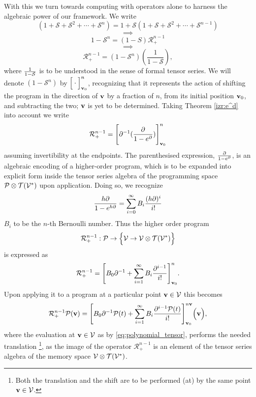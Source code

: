 With this we turn towards computing with operators alone to harness the algebraic power of our framework. We write
$$(1+\mathcal{S}+\mathcal{S}^2+\cdots+\mathcal{S}^n)=1+\mathcal{S}(1+\mathcal{S}+\mathcal{S}^2+\cdots+\mathcal{S}^{n-1})$$
   $$\implies$$
   $$1-\mathcal{S}^n=(1-S)\mathcal{R}^{n-1}_+$$
   $$\implies$$
  \begin{equation}
\mathcal{R}^{n-1}_+=(1-\mathcal{S}^n)(\frac{1}{1-\mathcal{S}}),
  \end{equation}
where $\frac{1}{1-\mathcal{S}}$ is to be understood in the sense of formal tensor series. We will denote $(1-\mathcal{S}^n)$ by $\Big[\cdot\Big]^n_{\mathbf{v}_0}$, recognizing that it represents the action of shifting the program in the direction of $\mathbf{v}$ by a fraction of $n$, from its initial position $\mathbf{v}_0$, and subtracting the two; $\mathbf{v}$ is yet to be determined. Taking Theorem \ref{izr:e^d} into account we write
  \begin{equation}\label{eq:Rn+Basic}
    \mathcal{R}^{n-1}_+=\Bigg[\partial^{-1}(\frac{\partial}{1-e^\partial})\Bigg]^n_{\mathbf{v}_0}
  \end{equation}
assuming invertibility at the endpoints. The parenthesised expression, $\frac{\partial}{1-e^\partial}$, is an algebraic encoding of a higher-order program, which is to be expanded into explicit form inside the tensor series algebra of the programming space $\mathcal{P}\otimes \mathcal{T}(\mathcal{V}^*)$ upon application. Doing so, we recognize
\begin{equation}
    	\frac{h\partial}{1-e^{h\partial}}=\sum\limits_{i=0}^{\infty}B_i\frac{(h\partial)^i}{i!}
    \end{equation}
$B_i$ to be the $n$-th Bernoulli number. Thus the higher order program
$$\mathcal{R}^{n-1}_+:\mathcal{P}\to\Big\{\mathcal{V}\to \mathcal{V}\otimes \mathcal{T}(\mathcal{V}^*)\Big\}$$
is expressed as 
    \begin{equation}\label{eq:Rn+}
      \mathcal{R}^{n-1}_+=\Bigg[B_0\partial^{-1}+\sum\limits_{i=1}^{\infty}B_i\frac{\partial^{i-1}}{i!}\Bigg]_{\mathbf{v}_0}^{n}.
    \end{equation}
Upon applying it to a program at a particular point $\mathbf{v}\in \mathcal{V}$ this becomes
\begin{equation}\label{eq:Rn+P}
  \mathcal{R}^{n-1}_+\mathcal{P}(\mathbf{v})=\Bigg[B_0\partial^{-1}\mathcal{P}(t)+\sum\limits_{i=1}^{\infty}B_i\frac{\partial^{i-1}\mathcal{P}(t)}{i!}\Bigg]_{\mathbf{v}_0}^{n\mathbf{v}} \Big(\mathbf{v}\Big),
    \end{equation}
where the evaluation at $\mathbf{v}\in \mathcal{V}$ as by \eqref{eq:polynomial_tensor}, performs the needed translation
\footnote{Both the translation and the shift are to be performed (at) by the same point $\mathbf{v}\in\mathcal{V}$.},
as the image of the operator $\mathcal{R}^{n-1}_+$ is an element of the tensor series algebra of the memory space $\mathcal{V}\otimes \mathcal{T}(\mathcal{V}^*)$.
